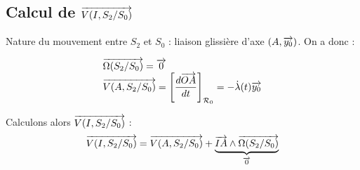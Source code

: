 \documentclass[10pt,oneside]{article}
\begin{document}

\subsection*{Calcul de $\overrightarrow{V(I,S_2/S_0)}$}
Nature du mouvement entre $S_2$ et $S_0$ : liaison glissière d'axe $(A,\overrightarrow{y_0})$.
On a donc :

$$
\begin{array}{l}
\overrightarrow{\Omega(S_2/S_0)} = \overrightarrow{0} \\
\overrightarrow{V(A,S_2/S_0)} = \left[\dfrac{d\overrightarrow{OA}}{dt}\right]_{\mathcal{R}_0}  = -\dot{\lambda}(t) \overrightarrow{y_0}\\
\end{array}
$$



Calculons alors $\overrightarrow{V(I,S_2/S_0)}$ :
$$ \overrightarrow{V(I,S_2/S_0)} = \overrightarrow{V(A,S_2/S_0)} + \underbrace{\overrightarrow{IA} \wedge \overrightarrow{\Omega(S_2/S_0)}}_{\overrightarrow{0}} $$
%
\end{document}
